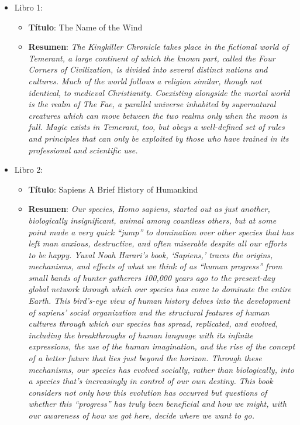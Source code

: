 \documentclass[12pt,a4paper, xcolor=table]{article}
\begin{document}
\begin{itemize}
\item Libro 1:
\begin{itemize}
\item \textbf{Título}: The Name of the Wind\cite{namewind}
\item \textbf{Resumen}: \textit{The Kingkiller Chronicle takes place in the fictional world of Temerant, a large continent of which the known part, called the Four Corners of Civilization, is divided into several distinct nations and cultures. Much of the world follows a religion similar, though not identical, to medieval Christianity. Coexisting alongside the mortal world is the realm of The Fae, a parallel universe inhabited by supernatural creatures which can move between the two realms only when the moon is full. Magic exists in Temerant, too, but obeys a well-defined set of rules and principles that can only be exploited by those who have trained in its professional and scientific use.}\cite{summaryNameWind}
\end{itemize}
\item Libro 2:
\begin{itemize}
\item \textbf{Título}: Sapiens A Brief History of Humankind\cite{sapiens}
\item \textbf{Resumen}: \textit{Our species, Homo sapiens, started out as just another, biologically insignificant, animal among countless others, but at some point made a very quick “jump” to domination over other species that has left man anxious, destructive, and often miserable despite all our efforts to be happy. Yuval Noah Harari’s book, ‘Sapiens,’ traces the origins, mechanisms, and effects of what we think of as “human progress” from small bands of hunter gatherers 100,000 years ago to the present-day global network through which our species has come to dominate the entire Earth. This bird’s-eye view of human history delves into the development of sapiens’ social organization and the structural features of human cultures through which our species has spread, replicated, and evolved, including the breakthroughs of human language with its infinite expressions, the use of the human imagination, and the rise of the concept of a better future that lies just beyond the horizon. Through these mechanisms, our species has evolved socially, rather than biologically, into a species that’s increasingly in control of our own destiny. This book considers not only how this evolution has occurred but questions of whether this “progress” has truly been beneficial and how we might, with our awareness of how we got here, decide where we want to go.}\cite{summarySapiens}
\end{itemize}
\end{itemize}
\end{document}
